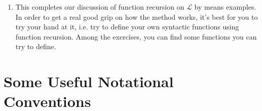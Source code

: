 \begin{enumerate}[\thesection.1]
\begin{proof}
\begin{enumerate}[(i)]
\begin{enumerate}[(a)]
			\item Assume the induction hypotheses that $c(\phi)$ is the length of the longest path from the root in $T(\phi)$ and $c(\psi)$ is the length of the longest path from the root in $T(\psi)$. By the (ii.a) definition of parsing trees, we know that:
					\begin{center}
\end{center}
Now think about the longest path you can travel in $T((\phi\circ\psi))$. Well, take the longest path you can find in either $T(\phi)$ or $T(\psi)$. Let's suppose that the path is in $T(\phi)$ (if it is in $T(\psi)$, the argument is completely analogous). The longest path you can travel from the root in $T((\phi\circ\psi))$ is going to be precisely this path plus the one new edge connecting $T(\phi)$ to the new root $(\phi\circ\psi)$. Since $c((\phi\circ\psi))=max(c(\phi),c(\psi))+1$, this just means that the claim also holds here. 
				\end{enumerate}
		
		\end{enumerate}
		We can thus use induction to infer that the claim holds for all $\phi$.			
	\end{proof}
	
	\item This completes our discussion of function recursion on $\mathcal{L}$ by means examples. In order to get a real good grip on how the method works, it's best for you to try your hand at it, i.e. try to define your own syntactic functions using function recursion. Among the exercises, you can find some functions you can try to define.

	\end{enumerate}

\section{Some Useful Notational Conventions}

